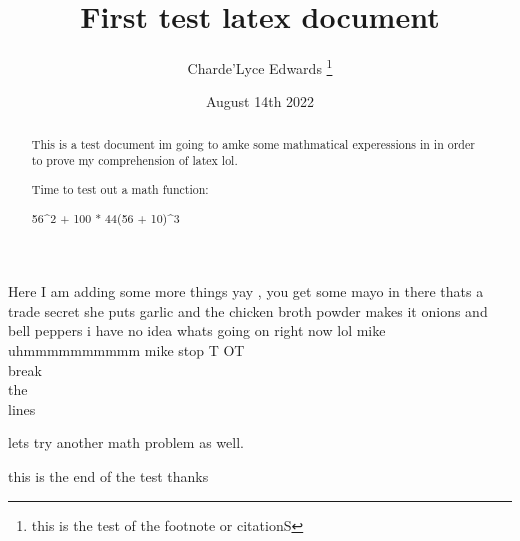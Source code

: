 \documentclass[12pt, letterpaper]{article}
\title{First  test latex document}
\author{Charde'Lyce Edwards \thanks{this is the test of the footnote or citationS}}
\date{August 14th 2022}
\begin{document}
    \begin{titlepage}
        \maketitle
    \end{titlepage}

   \begin{abstract}
    This is a test document im going to amke some mathmatical experessions in 
    in order to prove my comprehension of latex lol.
   \end{abstract} 
   Here I am adding some more things yay , you get some mayo in there  thats a trade secret 
   she puts garlic and the chicken broth powder makes it onions and bell peppers i have no idea whats going on right now lol 
   mike uhmmmmmmmmmm
   mike stop T OT 
   \\break \\ the \\lines
   \begin{abstract}
    Time to test out a math function:
   \end{abstract}
   \begin{abstract}
    56^2 + 100 * 44(56 + 10)^3
   \end{abstract}
   lets try another math problem as well.
   \begin{abstract}
   \end{abstract}
   this is the end of the test thanks 
\end{document}
